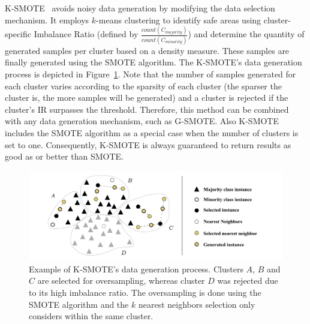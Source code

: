 \documentclass[remotesensing,article,submit,moreauthors,pdftex]{Definitions/mdpi}
\begin{document}
\begin{paracol}{2}
K-SMOTE~\cite{Douzas2018} avoids noisy data generation by modifying the data
selection mechanism. It employs $k$-means clustering to identify safe areas
using cluster-specific Imbalance Ratio (defined by
$\frac{count(C_{majority})}{count(C_{minority})}$) and determine the quantity of
generated samples per cluster based on a density measure. These samples are
finally generated using the SMOTE algorithm. The K-SMOTE's data generation
process is depicted in Figure~\ref{fig:kmeans_smote_example}. Note that the
number of samples generated for each cluster varies according to the sparsity of
each cluster (the sparser the cluster is, the more samples will be generated)
and a cluster is rejected if the cluster's IR surpasses the threshold.
Therefore, this method can be combined with any data generation mechanism, such
as G-SMOTE. Also K-SMOTE includes the SMOTE algorithm as a special case when the
number of clusters is set to one. Consequently, K-SMOTE is always guaranteed to
return results as good as or better than SMOTE.

\end{paracol}
\begin{figure}[H]
	\centering
    \captionsetup{justification=centering}
    \caption{Example of K-SMOTE's data generation process. Clusters $A$, $B$
        and $C$ are selected for oversampling, whereas cluster $D$ was
        rejected due to its high imbalance ratio. The oversampling is done
        using the SMOTE algorithm and the $k$ nearest neighbors selection only
        considers within the same cluster.
    \vspace{.2cm}}
	\label{fig:kmeans_smote_example}
	\includegraphics[width=1\linewidth]{../analysis/kmeans_smote_example}
\end{figure}
\end{document}
